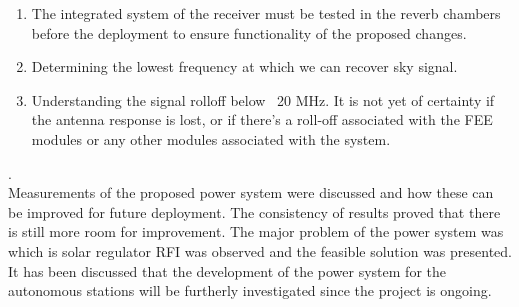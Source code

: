 \documentclass[12pt,a4paper]{report}
\begin{document}
\begin{enumerate}
\item The integrated system of the receiver must be tested in the reverb chambers before the deployment to ensure functionality of the proposed changes.

\item Determining the lowest frequency at which we can recover sky signal. 

\item Understanding the signal rolloff below ~20 MHz. It is not yet of certainty if the antenna response is lost, or if there's a roll-off associated with the FEE modules or any other modules associated with the system.

\end{enumerate}.\\
Measurements of the proposed power system were discussed and how these can be improved for future deployment. The consistency of results proved that there is still more room for improvement. The major problem of the power system was which is solar regulator RFI was observed and the feasible solution was presented. It has been discussed that the development of the power system for the autonomous stations will be furtherly investigated since the project is ongoing.

\newpage		
		
%

\end{document}

